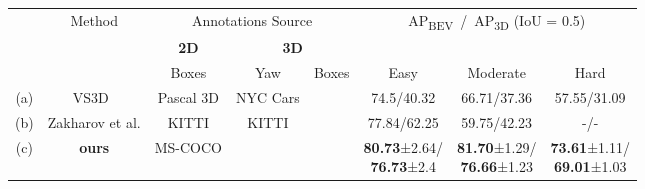 \begin{table*}[t]
\newcommand{\zero}{ZERO}
\centering
\setlength{\tabcolsep}{1mm}
\begin{tabular}{cc c c c  c c c}
\toprule
&\multirow{3}{*}{Method} & \multicolumn{3}{c}{Annotations Source} & \multicolumn{3}{c}{AP\textsubscript{BEV}~/~AP\textsubscript{3D} (IoU = 0.5)} \\
&& \textbf{2D} & \multicolumn{2}{c}{\textbf{3D}}  \\
&& Boxes & Yaw & Boxes & Easy & Moderate & Hard \\
\cmidrule(r){1-2}
\cmidrule(lr){3-3}
\cmidrule(lr){4-5}
\cmidrule(l){6-8}
(a) &VS3D~\cite{meng2020ws3d} & Pascal 3D & NYC Cars & & 74.5/40.32 & 66.71/37.36 & 57.55/31.09 \\
\hline
(b) &Zakharov et al. \cite{sdflabel} & KITTI & KITTI &  & 77.84/62.25 & 59.75/42.23 & -/- \\
\hline
(c) &\textbf{ours} &MS-COCO & &  & \multirowcell{2}{\textbf{80.73}±2.64/\\ \textbf{76.73}±2.4} & \multirowcell{2}{\textbf{81.70}±1.29/\\ \textbf{76.66}±1.23} & \multirowcell{2}{\textbf{73.61}±1.11/\\ \textbf{69.01}±1.03} \\

\end{tabular}
\end{table*}
